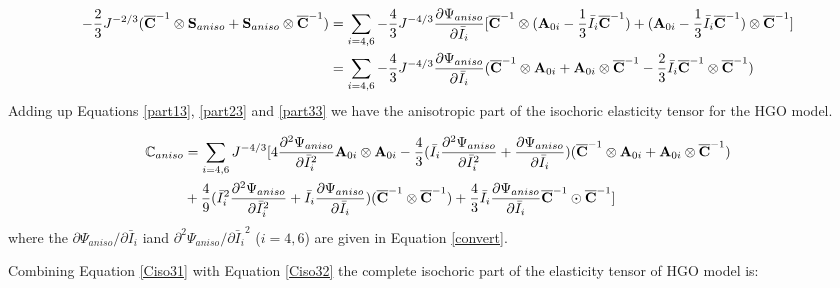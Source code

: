 \begin{equation} \label{part33}
\begin{split}
-\frac{2}{3}J^{-2/3}({\overline{\bold{C}}}^{-1} \otimes \bold{S}_{aniso} + \bold{S}_{aniso} \otimes {\overline{\bold{C}}}^{-1}) &=
\sum_{i = 4, 6} -\frac{4}{3}J^{-4/3}\frac{\partial\Psi_{aniso}}{\partial\bar{I}_i}
[\overline{\bold{C}}^{-1} \otimes (\bold{A}_{0i} - \frac{1}{3}\bar{I}_i \overline{\bold{C}}^{-1})
+ (\bold{A}_{0i} - \frac{1}{3}\bar{I}_i \overline{\bold{C}}^{-1}) \otimes \overline{\bold{C}}^{-1}] \\
&= \sum_{i = 4, 6} -\frac{4}{3}J^{-4/3}\frac{\partial\Psi_{aniso}}{\partial\bar{I}_i}
(\overline{\bold{C}}^{-1} \otimes \bold{A}_{0i} + \bold{A}_{0i} \otimes \overline{\bold{C}}^{-1} 
- \frac{2}{3} \bar{I}_i \overline{\bold{C}}^{-1} \otimes \overline{\bold{C}}^{-1}) \\
\end{split}
\end{equation}
Adding up Equations \ref{part13}, \ref{part23} and \ref{part33} we have the anisotropic part of the isochoric elasticity tensor for the HGO model.

\begin{equation} \label{Ciso31}
\begin{split}
\mathbb{C}_{aniso} 
&= \sum_{i = 4, 6} J^{-4/3}[4\frac{\partial^2\Psi_{aniso}}{\partial{\bar{I}_i}^2} \bold{A}_{0i} \otimes \bold{A}_{0i} - \frac{4}{3}(\bar{I}_i\frac{\partial^2\Psi_{aniso}}{\partial{\bar{I}_i}^2} + \frac{\partial\Psi_{aniso}}{\partial{\bar{I}_i}})(\overline{\bold{C}}^{-1} \otimes \bold{A}_{0i} + \bold{A}_{0i} \otimes \overline{\bold{C}}^{-1}) \\
&+ \frac{4}{9}({\bar{I}_i}^2\frac{\partial^2\Psi_{aniso}}{\partial{\bar{I}_i}^2} + \bar{I}_i\frac{\partial\Psi_{aniso}}{\partial{\bar{I}_i}})(\overline{\bold{C}}^{-1} \otimes \overline{\bold{C}}^{-1}) 
+ \frac{4}{3}\bar{I}_i \frac{\partial\Psi_{aniso}}{\partial{\bar{I}_i}} \overline{\bold{C}}^{-1} \odot \overline{\bold{C}}^{-1}]
\end{split}
\end{equation}
where the $\partial\Psi_{aniso}/\partial{\bar{I}_i}$ iand $\partial^2\Psi_{aniso}/{\partial{\bar{I}_i}^2}$ ($i = 4, 6$) are given in Equation \ref{convert}.

Combining Equation \ref{Ciso31} with Equation \ref{Ciso32} the complete isochoric part of the elasticity tensor of HGO model is:

